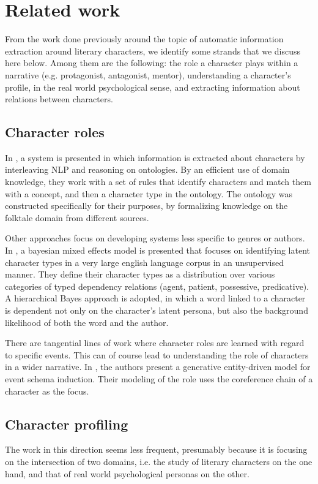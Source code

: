 \section{Related work}
From the work done previously around the topic of automatic information extraction around literary characters, we identify some strands that we discuss here below. Among them are the following: the role a character plays within a narrative (e.g. protagonist, antagonist, mentor), understanding a character's profile, in the real world psychological sense, and extracting information about relations between characters. 

\subsection{Character roles}
In \cite{groza2015information}, a system is presented in which information is extracted about characters by interleaving NLP and reasoning on ontologies. By an efficient use of domain knowledge, they work with a set of rules that identify characters and match them with a concept, and then a character type in the ontology. The ontology was constructed specifically for their purposes, by formalizing knowledge on the folktale domain from different sources. 

Other approaches focus on developing systems less specific to genres or authors. In \cite{bamman2014bayesian}, a bayesian mixed effects model is presented that focuses on identifying latent character types in a very large english language corpus in an unsupervised manner. They define their character types as a distribution over various categories of typed dependency relations (agent, patient, possessive, predicative). A hierarchical Bayes approach is adopted, in which a word linked to a character is dependent not only on the character's latent persona, but also the background likelihood of both the word and the author.

There are tangential lines of work where character roles are learned with regard to specific events. This can of course lead to understanding the role of characters in a wider narrative. In \cite{chambers2013event}, the authors present a generative entity-driven model for event schema induction. Their modeling of the role uses the coreference chain of a character as the focus.


\subsection{Character profiling}
The work in this direction seems less frequent, presumably because it is focusing on the intersection of two domains, i.e. the study of literary characters on the one hand, and that of real world psychological personas on the other.

